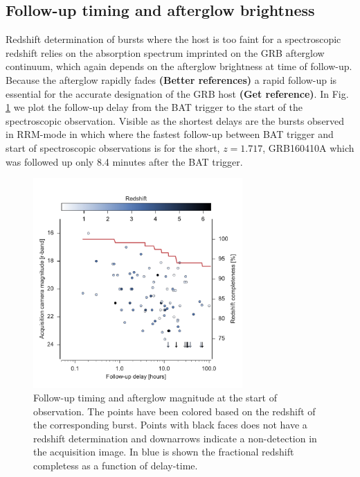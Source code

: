 \documentclass{aa}    %
\newcommand\todo[1]{\textbf{(#1)}}
\begin{document}
\subsection{Follow-up timing and afterglow brightness} \label{timing}

Redshift determination of bursts where the host is too faint for a spectroscopic
redshift relies on the absorption spectrum imprinted on the GRB afterglow
continuum, which again depends on the afterglow brightness at time of follow-up.
Because the afterglow rapidly fades \citep{Nousek2006, Vecchio2016}\todo{Better
	references} a rapid follow-up is essential for the accurate designation of the
GRB host \todo{Get reference}. In Fig. \ref{fig:timing} we plot the follow-up
delay from the BAT trigger to the start of the spectroscopic observation.
Visible as the shortest delays are the bursts observed in RRM-mode in which
where the fastest follow-up between BAT trigger and start of spectroscopic
observations is for the short, $z = 1.717$, GRB160410A which was followed up
only 8.4 minutes after the BAT trigger.


\begin{figure}
	\centerline{\includegraphics[width=8cm]{figures/timing.pdf}}
	\caption{Follow-up timing and afterglow magnitude at the start of observation.
	The points have been colored based on the redshift of the corresponding burst.
	Points with black faces does not have a redshift determination and downarrows
	indicate a non-detection in the acquisition image. In blue is shown the
	fractional redshift completess as a function of delay-time.}
	\label{fig:timing}
\end{figure}
\end{document}
